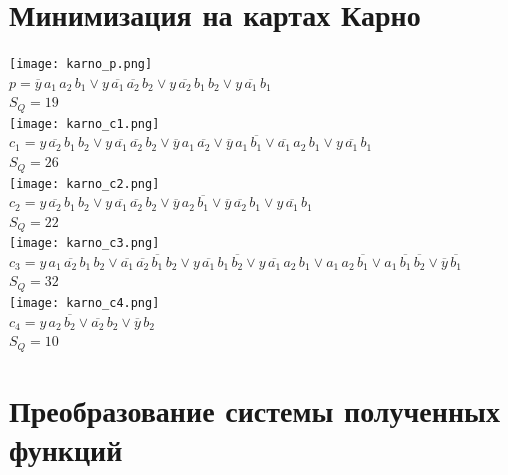 \documentclass[12pt,a4paper]{report}
\begin{document}
\section*{Минимизация на картах Карно}
\texttt{[image: karno\_p.png]}\\
$p=\overline{y}\,a_1\,a_2\,b_1 \lor y\,\overline{a_1}\,\overline{a_2}\,b_2 \lor y\,\overline{a_2}\,b_1\,b_2 \lor y\,\overline{a_1}\,b_1$\\
$S_Q=19$\\
\hfill\break
\texttt{[image: karno\_c1.png]}\\
$c_1=y\,\overline{a_2}\,b_1\,b_2 \lor y\,\overline{a_1}\,\overline{a_2}\,b_2 \lor \overline{y}\,a_1\,\overline{a_2} \lor \overline{y}\,a_1\,\overline{b_1} \lor \overline{a_1}\,a_2\,b_1 \lor y\,\overline{a_1}\,b_1$\\
$S_Q=26$\\
\hfill\break
\texttt{[image: karno\_c2.png]}\\
$c_2=y\,\overline{a_2}\,b_1\,b_2 \lor y\,\overline{a_1}\,\overline{a_2}\,b_2 \lor  \overline{y}\,a_2\,\overline{b_1} \lor \overline{y}\,\overline{a_2}\,b_1 \lor y\,\overline{a_1}\,b_1$\\
$S_Q=22$\\
\hfill\break
\texttt{[image: karno\_c3.png]}\\
$c_3=y\,a_1\,\overline{a_2}\,b_1\,b_2 \lor \overline{a_1}\,\overline{a_2}\,\overline{b_1}\,b_2 \lor y\,\overline{a_1}\,b_1\,\overline{b_2} \lor y\,\overline{a_1}\,a_2\,b_1 \lor a_1\,a_2\,\overline{b_1} \lor a_1\,\overline{b_1}\,\overline{b_2} \lor \overline{y}\,\overline{b_1}$\\
$S_Q=32$\\
\hfill\break
\texttt{[image: karno\_c4.png]}\\
$c_4=y\,a_2\,\overline{b_2} \lor \overline{a_2}\,b_2 \lor \overline{y}\,b_2$\\
$S_Q=10$\\
\newpage
\section*{Преобразование системы полученных функций}
\end{document}
